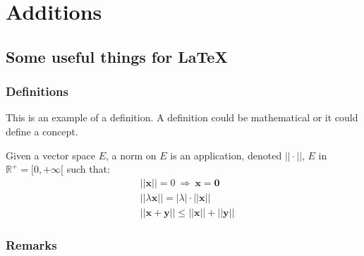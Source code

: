\documentclass[11pt]{book} %
\begin{document}
\part{Additions}









\chapter{Some useful things for LaTeX}




\section{Definitions}

This is an example of a definition. A definition could be mathematical or it could define a concept.

\begin{definition}
Given a vector space $E$, a norm on $E$ is an application, denoted $||\cdot||$, $E$ in $\mathbb{R}^+=[0,+\infty[$ such that:
\begin{align}
& ||\mathbf{x}||=0\ \Rightarrow\ \mathbf{x}=\mathbf{0}\\
& ||\lambda \mathbf{x}||=|\lambda|\cdot ||\mathbf{x}||\\
& ||\mathbf{x}+\mathbf{y}||\leq ||\mathbf{x}||+||\mathbf{y}||
\end{align}
\end{definition}


\section{Remarks}
\end{document}
